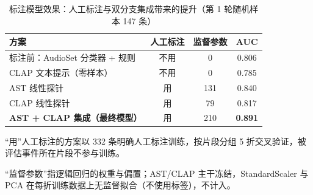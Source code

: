 \begin{table}[htbp]\centering
\caption{标注模型效果：人工标注与双分支集成带来的提升（第 1 轮随机样本 147 条）}\label{tab:model_eff}
{\small\begin{threeparttable}
\begin{tabular}{lccc}\toprule
方案 & 人工标注 & 监督参数 & AUC \\
\midrule
标注前：AudioSet 分类器 + 规则 & 不用 & 0 & 0.806 \\
CLAP 文本提示（零样本） & 不用 & 0 & 0.785 \\
AST 线性探针 & 用 & 131 & 0.840 \\
CLAP 线性探针 & 用 & 79 & 0.817 \\
\textbf{AST + CLAP 集成（最终模型）} & 用 & 210 & \textbf{0.891} \\
\bottomrule\end{tabular}
\begin{tablenotes}\footnotesize\item “用”人工标注的方案以 332 条明确人工标注训练，按片段分组 5 折交叉验证，被评估事件所在片段不参与训练。\item “监督参数”指逻辑回归的权重与偏置；AST/CLAP 主干冻结，StandardScaler 与 PCA 在每折训练数据上无监督拟合（不使用标签），不计入。\end{tablenotes}\end{threeparttable}}
\end{table}
